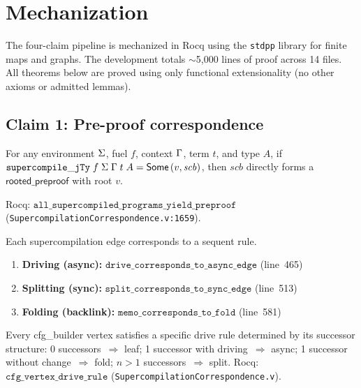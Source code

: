 \section{Mechanization}
\label{sec:mech}

The four-claim pipeline is mechanized in Rocq using the \texttt{stdpp} library for finite maps and graphs.
The development totals $\sim$5,000 lines of proof across 14 files.
All theorems below are proved using only functional extensionality (no other axioms or admitted lemmas).

\subsection{Claim 1: Pre-proof correspondence}

\begin{theorem}
\label{thm:mech-preproof}
For any environment $\Sigma$, fuel $f$, context $\Gamma$, term $t$, and type $A$, if
$\mathtt{supercompile\_jTy}\;f\;\Sigma\;\Gamma\;t\;A = \mathsf{Some}\,(v,\mathit{scb})$,
then $\mathit{scb}$ directly forms a $\mathsf{rooted\_preproof}$ with root $v$.
\end{theorem}

\noindent Rocq: $\texttt{all\_supercompiled\_programs\_yield\_preproof}$ (\texttt{SupercompilationCorrespondence.v:1659}).

\begin{theorem}
\label{thm:mech-step}
Each supercompilation edge corresponds to a sequent rule.
\begin{enumerate}[leftmargin=*,nosep]
\item \textbf{Driving (async):} $\texttt{drive\_corresponds\_to\_async\_edge}$ (line~465)
\item \textbf{Splitting (sync):} $\texttt{split\_corresponds\_to\_sync\_edge}$ (line~513)
\item \textbf{Folding (backlink):} $\texttt{memo\_corresponds\_to\_fold}$ (line~581)
\end{enumerate}
\end{theorem}

\begin{proposition}
\label{thm:mech-vertex}
Every cfg\_builder vertex satisfies a specific drive rule determined by its successor structure: 0 successors~$\Rightarrow$ leaf; 1 successor with driving~$\Rightarrow$ async; 1 successor without change~$\Rightarrow$ fold; $n>1$ successors~$\Rightarrow$ split.
\newline Rocq: $\texttt{cfg\_vertex\_drive\_rule}$ (\texttt{SupercompilationCorrespondence.v}).
\end{proposition}

